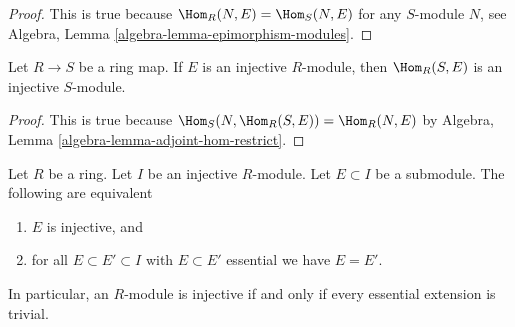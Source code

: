 \begin{proof}
This is true because $\Hom_R(N, E) = \Hom_S(N, E)$ for any $S$-module $N$,
see Algebra, Lemma \ref{algebra-lemma-epimorphism-modules}.
\end{proof}

\begin{lemma}
\label{lemma-hom-injective}
Let $R \to S$ be a ring map. If $E$ is an injective $R$-module,
then $\Hom_R(S, E)$ is an injective $S$-module.
\end{lemma}

\begin{proof}
This is true because $\Hom_S(N, \Hom_R(S, E)) = \Hom_R(N, E)$ by
Algebra, Lemma \ref{algebra-lemma-adjoint-hom-restrict}.
\end{proof}

\begin{lemma}
\label{lemma-essential-extensions-in-injective}
Let $R$ be a ring. Let $I$ be an injective $R$-module. Let $E \subset I$
be a submodule. The following are equivalent
\begin{enumerate}
\item $E$ is injective, and
\item for all $E \subset E' \subset I$ with $E \subset E'$ essential
we have $E = E'$.
\end{enumerate}
In particular, an $R$-module is injective if and only if every essential
extension is trivial.
\end{lemma}

